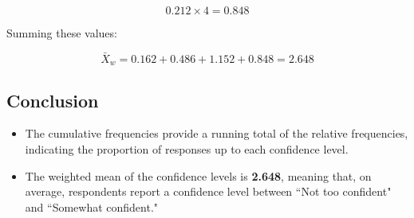\documentclass{article}
\begin{document}
\[
0.212 \times 4 = 0.848
\]

Summing these values:

\[
\bar{X}_w = 0.162 + 0.486 + 1.152 + 0.848 = 2.648
\]

\subsection*{Conclusion}

\begin{itemize}
    \item The cumulative frequencies provide a running total of the relative frequencies, indicating the proportion of responses up to each confidence level.
    \item The weighted mean of the confidence levels is \textbf{2.648}, meaning that, on average, respondents report a confidence level between ``Not too confident" and ``Somewhat confident."
\end{itemize}
\end{document}
